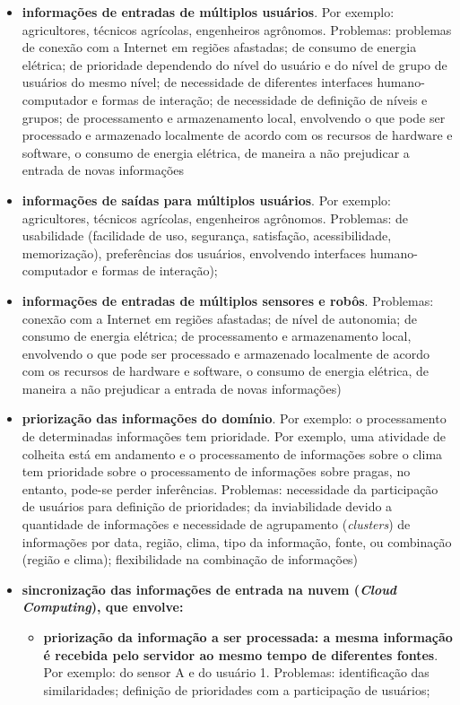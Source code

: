 \documentclass[12pt]{article}
\begin{document}
\begin{itemize}
	\item \textbf{informações de entradas de múltiplos usuários}. Por exemplo: agricultores, técnicos agrícolas, engenheiros agrônomos. Problemas: problemas de conexão com a Internet em regiões afastadas; de consumo de energia elétrica; de prioridade dependendo do nível do usuário e do nível de grupo de usuários do mesmo nível; de necessidade de diferentes interfaces humano-computador e formas de interação; de necessidade de definição de níveis e grupos; de processamento e armazenamento local, envolvendo o que pode ser processado e armazenado localmente de acordo com os recursos de hardware e software, o consumo de energia elétrica, de maneira a não prejudicar a entrada de novas informações
	\item \textbf{informações de saídas para múltiplos usuários}. Por exemplo: agricultores, técnicos agrícolas, engenheiros agrônomos. Problemas: de usabilidade (facilidade de uso, segurança, satisfação, acessibilidade, memorização), preferências dos usuários, envolvendo interfaces humano-computador e formas de interação);
	\item \textbf{informações de entradas de múltiplos sensores e robôs}. Problemas: conexão com a Internet em regiões afastadas; de nível de autonomia; de consumo de energia elétrica; de processamento e armazenamento local, envolvendo o que pode ser processado e armazenado localmente de acordo com os recursos de hardware e software, o consumo de energia elétrica, de maneira a não prejudicar a entrada de novas informações)
	\item \textbf{priorização das informações do domínio}. Por exemplo: o processamento de determinadas informações tem prioridade. Por exemplo, uma atividade de colheita está em andamento e o processamento de informações sobre o clima tem prioridade sobre o processamento de informações sobre pragas, no entanto, pode-se perder inferências. Problemas: necessidade da participação de usuários para definição de prioridades; da inviabilidade devido a quantidade de informações e necessidade de agrupamento (\textit{clusters}) de informações por data, região, clima, tipo da informação, fonte, ou combinação (região e clima); flexibilidade na combinação de informações)
	\item \textbf{sincronização das informações de entrada na nuvem (\textit{Cloud Computing}), que  envolve:}
		\begin{itemize}
			\item \textbf{priorização da informação a ser processada: a mesma informação é recebida pelo servidor ao mesmo tempo de diferentes fontes}. Por exemplo: do sensor A e do usuário 1. Problemas: identificação das similaridades; definição de prioridades com a participação de usuários;

\end{itemize}
\end{itemize}
\end{document}
